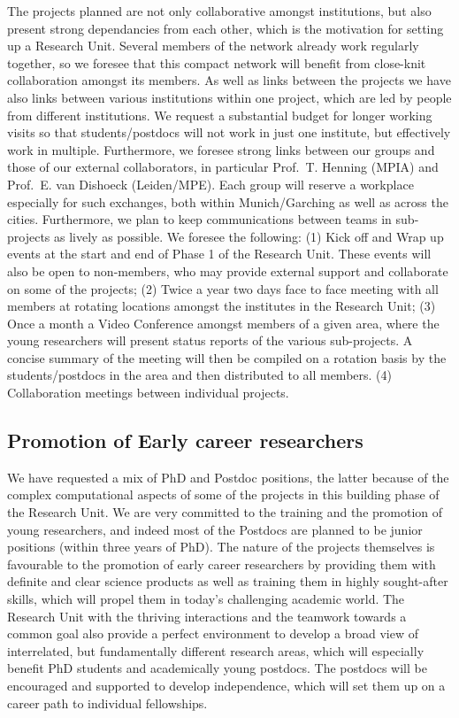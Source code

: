\documentclass[10pt,fleqn,twoside]{article}
\begin{document}
\noindent The projects planned are not only collaborative amongst institutions,
but also present strong dependancies from each other, which is the
motivation for setting up a Research Unit. Several members of the
network already work regularly together, so we foresee that this compact
network will benefit from close-knit collaboration amongst its members.
As well as links between the projects we have also links between
various institutions within one project, which are led by people from
different institutions. We request a substantial budget for longer
working visits so that students/postdocs will not work in just one
institute, but effectively work in multiple. Furthermore, we foresee
strong links between our groups and those of our external
collaborators, in particular Prof.~T. Henning (MPIA) and Prof.~E. van
Dishoeck (Leiden/MPE). Each group will reserve a workplace especially for such exchanges, both within Munich/Garching as well as across the cities. 
Furthermore, we plan to keep communications between teams in
sub-projects as lively as possible. We foresee the following: (1) Kick
off and Wrap up events at the start and end of Phase 1 of the Research
Unit. These events will also be open to non-members, who may provide
external support and collaborate on some of the projects; (2) Twice a
year two days face to face meeting with all members at rotating
locations amongst the institutes in the Research Unit; (3) Once a
month a Video Conference amongst members of a given area, where the young
researchers will present status reports of the various sub-projects. A
concise summary of the meeting will then be compiled on a rotation
basis by the students/postdocs in the area and then distributed to
all members. (4) Collaboration meetings between individual projects.

\subsection{Promotion of Early career researchers}

\noindent We have requested a mix of PhD and Postdoc positions, the
latter because of the complex computational aspects of some of the
projects in this building phase of the Research Unit. We are very
committed to the training and the promotion of young researchers, and
indeed most of the Postdocs are planned to be junior positions (within
three years of PhD). The nature of the projects themselves is
favourable to the promotion of early career researchers by providing
them with definite and clear science products as well as training them
in highly sought-after skills, which will propel them in today's
challenging academic world. The Research Unit with the thriving
interactions and the teamwork towards a common goal also provide a
perfect environment to develop a broad view of interrelated, but
fundamentally different research areas, which will especially benefit
PhD students and academically young postdocs. The postdocs will be
encouraged and supported to develop independence, which will set them
up on a career path to individual fellowships. 
\end{document}
